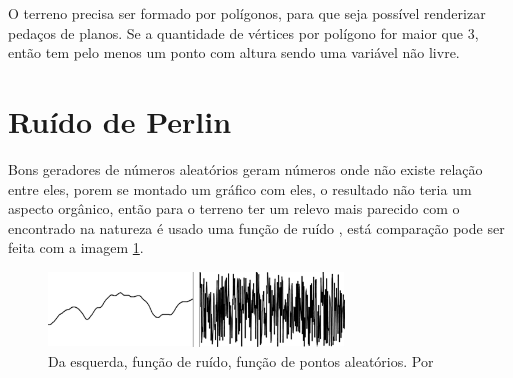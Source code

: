 O terreno precisa ser formado por polígonos, para que seja possível renderizar pedaços de planos.
Se a quantidade de vértices por polígono for maior que $3$, então tem pelo menos um ponto com altura sendo uma 
variável não livre.
%

\section{Ruído de Perlin}
Bons geradores de números aleatórios geram números onde não existe relação entre
eles, porem se montado um gráfico com eles, o resultado não teria um aspecto
orgânico, então para o terreno ter um relevo mais parecido com o encontrado na 
natureza é usado uma função de ruído \cite{shiffman2012nature}, está comparação
pode ser feita com a imagem \ref{fig:randomAndNoise}. 
\begin{figure}[H]
    \centering
    \includegraphics[width=0.7\textwidth]{figuras/randomAndNoise.png}
    \caption{Da esquerda, função de ruído, função de pontos aleatórios. Por \cite{shiffman2012nature}}
    \label{fig:randomAndNoise}
\end{figure}

